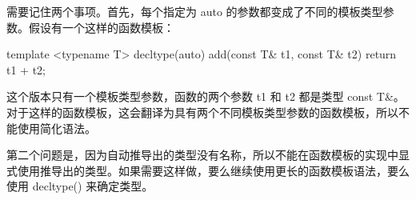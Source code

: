 需要记住两个事项。首先，每个指定为 auto 的参数都变成了不同的模板类型参数。假设有一个这样的函数模板：

\begin{cpp}
template <typename T>
decltype(auto) add(const T& t1, const T& t2) { return t1 + t2; }
\end{cpp}

这个版本只有一个模板类型参数，函数的两个参数 t1 和 t2 都是类型 const T\&。对于这样的函数模板，这会翻译为具有两个不同模板类型参数的函数模板，所以不能使用简化语法。

第二个问题是，因为自动推导出的类型没有名称，所以不能在函数模板的实现中显式使用推导出的类型。如果需要这样做，要么继续使用更长的函数模板语法，要么使用 decltype() 来确定类型。






















